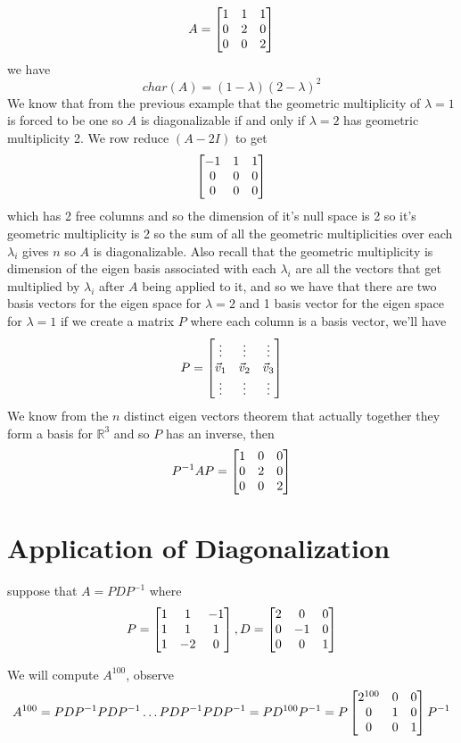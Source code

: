 \documentclass[11pt]{book}
\begin{document}
\begin{eg}
    \[
    A= \begin{bmatrix} 1 & 1 & 1 \\ 0 & 2 & 0 \\ 0 & 0 & 2 \end{bmatrix}
    \]
    we have 
    \[
        char\left(A\right) = \left( 1 - \lambda  \right) \left( 2 - \lambda  \right) ^2 
    \]
    We know that from the previous example that the geometric multiplicity of $\lambda = 1$ is forced to be one so $A$ is diagonalizable if and only if $\lambda = 2$ has geometric multiplicity 2. We row reduce $\left( A - 2I \right) $ to get 
    \[
    \begin{bmatrix} -1 & 1 & 1 \\ 0 & 0 & 0 \\ 0 & 0 & 0 \end{bmatrix}
    \]
    which has 2 free columns and so the dimension of it's null space is 2 so it's geometric multiplicity is 2 so the sum of all the geometric multiplicities over each $\lambda _{i} $ gives $n$ so $A$ is diagonalizable. Also recall that the geometric multiplicity is dimension of the eigen basis associated with each $\lambda _{i} $ are all the vectors that get multiplied by $\lambda _{i} $ after $A$ being applied to it, and so we have that there are two basis vectors for the eigen space for $\lambda = 2$ and 1 basis vector for the eigen space for $\lambda = 1$ if we create a matrix $P$ where each column is a basis vector, we'll have
    \[
    P= \begin{bmatrix} \vdots  & \vdots  & \vdots  \\ \vec{v} _{1}  & \vec{v} _{2}  & \vec{v} _{3}  \\ \vdots  & \vdots  & \vdots  \end{bmatrix}
    \]
    We know from the $n$ distinct eigen vectors theorem that actually together they form a basis for $\mathbb{R} ^{3} $  and so $P$ has an inverse, then 
    \[
    P^{-1} AP= \begin{bmatrix} 1 & 0 & 0 \\ 0 & 2 & 0 \\ 0 & 0 & 2 \end{bmatrix}
    \]
\end{eg}

\section{Application of Diagonalization}%
\label{sec:application_of_diagonalization}

suppose that $A= PDP^{-1} $ where
\[
P= \begin{bmatrix} 1 & 1 & -1 \\ 1 & 1 & 1 \\ 1 & -2 & 0 \end{bmatrix}, D= \begin{bmatrix} 2 & 0 & 0 \\ 0 & -1 & 0 \\ 0 & 0 & 1 \end{bmatrix}
\]
\begin{eg}
    We will compute $A^{100} $, observe
    \[
    A^{100} =  PDP^{-1}   PDP^{-1}  \ldots PDP^{-1}   PDP^{-1}  = PD^{100} P^{-1} = P\begin{bmatrix} 2^{100}  & 0 & 0 \\ 0 & 1 & 0 \\ 0 & 0 & 1 \end{bmatrix}P^{-1}  
    \]
\end{eg}
\end{document}
